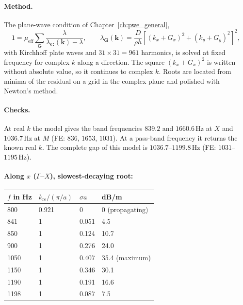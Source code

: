 \paragraph{Method.} The plane-wave condition of Chapter~\ref{ch:pwe_general},
\begin{equation}
  1 = \mu_\mathrm{eff}\sum_{\mathbf{G}} \frac{\lambda}{\lambda_\mathbf{G}(\mathbf{k}) - \lambda},
  \qquad
  \lambda_\mathbf{G}(\mathbf{k}) = \frac{D}{\rho h}\left[(k_x + G_x)^2 + (k_y + G_y)^2\right]^2,
\end{equation}
with Kirchhoff plate waves and $31\times 31 = 961$ harmonics, is solved at fixed
frequency for complex $k$ along a direction. The square $(k_x + G_x)^2$ is written
without absolute value, so it continues to complex $k$. Roots are located from minima
of the residual on a grid in the complex plane and polished with Newton's method.

\paragraph{Checks.} At real $k$ the model gives the band frequencies $839.2$ and
$1660.6\,\mathrm{Hz}$ at $X$ and $1036.7\,\mathrm{Hz}$ at $M$ (FE: $836$, $1653$,
$1031$). At a pass-band frequency it returns the known real $k$. The complete gap of
this model is $1036.7$--$1199.8\,\mathrm{Hz}$ (FE: $1031$--$1195\,\mathrm{Hz}$).

\paragraph{Along $x$ ($\Gamma$--$X$), slowest-decaying root:}

\begin{center}
\begin{tabular}{|l|l|l|l|}
\hline
$f$ in Hz & $k_\mathrm{re}/(\pi/a)$ & $\sigma a$ & dB/m \\
\hline
800 & 0.921 & 0 & 0 (propagating) \\
841 & 1 & 0.051 & 4.5 \\
850 & 1 & 0.124 & 10.7 \\
900 & 1 & 0.276 & 24.0 \\
1050 & 1 & 0.407 & 35.4 (maximum) \\
1150 & 1 & 0.346 & 30.1 \\
1190 & 1 & 0.191 & 16.6 \\
1198 & 1 & 0.087 & 7.5 \\
\hline
\end{tabular}
\end{center}

